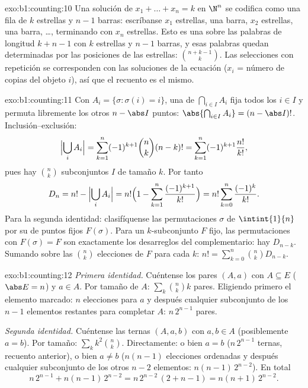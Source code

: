 \begin{solution}{exo:b1:counting:10}
Una solución de $x_1 + \dots + x_n = k$ en $\N^n$ se codifica como una
fila de $k$ estrellas y $n - 1$ barras: escríbanse $x_1$ estrellas, una
barra, $x_2$ estrellas, una barra, \dots, terminando con $x_n$
estrellas. Esto es una  sobre las palabras de longitud
$k + n - 1$ con $k$ estrellas y $n - 1$ barras, y esas palabras quedan
determinadas por las posiciones de las estrellas:
$\binom{n + k - 1}{k}$. Las selecciones con repetición se corresponden
con las soluciones de la ecuación ($x_i$ = número de copias del objeto
$i$), así que el recuento es el mismo.
\end{solution}

\begin{solution}{exo:b1:counting:11}
Con $A_i = \{\sigma : \sigma(i) = i\}$, una  de
$\bigcap_{i \in I} A_i$ fija todos los $i \in I$ y permuta libremente
los otros $n - \abs I$ puntos: $\abs{\bigcap_{i \in I} A_i} =
(n - \abs I)!$. Inclusión--exclusión:
\[
\Bigl|\bigcup_i A_i\Bigr|
= \sum_{k=1}^{n} (-1)^{k+1} \binom nk (n-k)!
= \sum_{k=1}^{n} (-1)^{k+1} \frac{n!}{k!} ,
\]
pues hay $\binom nk$ subconjuntos $I$ de tamaño $k$. Por tanto
\[
D_n = n! - \Bigl|\bigcup_i A_i\Bigr|
= n!\Bigl(1 - \sum_{k=1}^{n} \frac{(-1)^{k+1}}{k!}\Bigr)
= n! \sum_{k=0}^{n} \frac{(-1)^k}{k!} .
\]
Para la segunda identidad: clasifíquense las permutaciones $\sigma$ de
$\intint{1}{n}$ por su  de puntos fijos $F(\sigma)$. Para un
$k$-subconjunto $F$ fijo, las permutaciones con $F(\sigma) = F$ son
exactamente los desarreglos del complementario: hay $D_{n-k}$. Sumando
sobre las $\binom nk$ elecciones de $F$ para cada $k$:
$n! = \sum_{k=0}^{n} \binom nk D_{n-k}$.
\end{solution}

\begin{solution}{exo:b1:counting:12}
\emph{Primera identidad.} Cuéntense los pares $(A, a)$ con $A \subseteq E$
($\abs E = n$) y $a \in A$. Por tamaño de $A$: $\sum_k \binom nk k$
pares. Eligiendo primero el elemento marcado: $n$ elecciones para $a$ y
después cualquier subconjunto de los $n - 1$ elementos restantes para
completar $A$: $n\,2^{n-1}$ pares.

\emph{Segunda identidad.} Cuéntense las ternas $(A, a, b)$ con
$a, b \in A$ (posiblemente $a = b$). Por tamaño:
$\sum_k k^2 \binom nk$. Directamente: o bien $a = b$ ($n\,2^{n-1}$
ternas, recuento anterior), o bien $a \neq b$ ($n(n-1)$ elecciones
ordenadas y después cualquier subconjunto de los otros $n - 2$
elementos: $n(n-1)\,2^{n-2}$). En total
\[
n\,2^{n-1} + n(n-1)\,2^{n-2} = n\,2^{n-2}\,(2 + n - 1)
= n(n+1)\,2^{n-2} .
\]
\end{solution}

